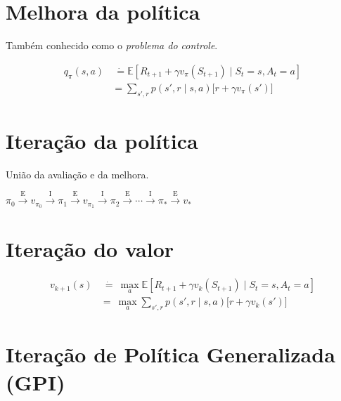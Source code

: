 \documentclass{article}
\begin{document}
\section{Melhora da política}

    Também conhecido como o \textit{problema do controle}.
    
    \begin{equation}
        \begin{split}
            q_{\pi}(s,a) & \ \dot{=} \mathbb{E} \left[ R_{t+1} + \gamma v_{\pi}(S_{t+1}) \mid S_t = s, A_t = a \right] \\
            & = \sum_{s',r} p(s', r \mid s, a) \Big[ r + \gamma v_{\pi}(s') \Big]
        \end{split}
    \end{equation}

\section{Iteração da política}

    União da avaliação e da melhora.
    
    \begin{center}
        \begin{math}
            \pi_0 \xrightarrow{\ \textrm{E} \ } 
            v_{\pi_0} \xrightarrow{\ \textrm{I} \ } 
            \pi_1 \xrightarrow{\ \textrm{E} \ } 
            v_{\pi_1} \xrightarrow{\ \textrm{I} \ } 
            \pi_2 \xrightarrow{\ \textrm{E} \ } 
            \cdots \xrightarrow{\ \textrm{I} \ }
            \pi_* \xrightarrow{\ \textrm{E} \ } v_{*}
        \end{math}
    \end{center}
    
\section{Iteração do valor}

    \begin{equation}
        \begin{split}
            v_{k+1}(s) & \  \dot{=} \ \max_a \mathbb{E}[R_{t+1} + \gamma v_k(S_{t+1}) \mid S_t = s, A_t = a] \\
            & = \ \max_a \sum_{s',r} p(s', r \mid s, a) \Big[ r + \gamma v_k(s') \Big]
        \end{split}
    \end{equation}

\section{Iteração de Política Generalizada (GPI)}
\end{document}
